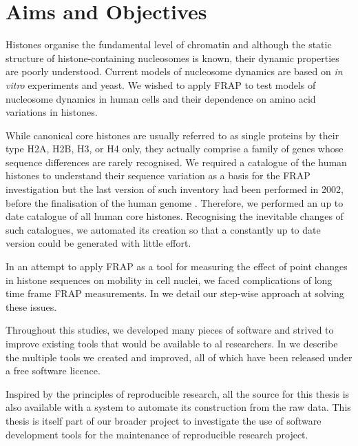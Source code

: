 

\section{Aims and Objectives}

  Histones organise the fundamental level of chromatin and
  although the static structure of histone-containing nucleosomes is
  known, their dynamic properties are poorly understood.  Current
  models of nucleosome dynamics are based on \textit{in vitro}
  experiments and yeast.  We wished to apply FRAP to test
  models of nucleosome dynamics in human cells and their dependence on
  amino acid variations in histones.

  While canonical core histones are usually referred to as single
  proteins by their type H2A, H2B,
  H3, or H4 only, they actually comprise a family of genes whose
  sequence differences are rarely recognised.
  We required a catalogue of the human histones to understand their
  sequence variation as a basis for the FRAP investigation
  but the last version of such inventory had been performed in
  2002, before the finalisation of the human genome \citep{Marzluff02}.
  Therefore, we performed an up to
  date catalogue of all human core histones.  Recognising the inevitable
  changes of such catalogues, we automated its creation so that a
  constantly up to date version could be generated with little effort.

  In an attempt to apply FRAP as a tool for measuring the effect of point
  changes in histone sequences on mobility in cell nuclei,
  we faced complications
  of long time frame FRAP measurements.  In  we detail our
  step-wise approach at solving these issues.

  Throughout this studies, we developed many pieces of software and
  strived to improve existing tools that would be available to al
  researchers.  In  we describe the multiple tools we
  created and improved, all of which have been released under a free
  software licence.

  Inspired by the principles of reproducible research, all the source
  for this thesis is also available with a system to automate its
  construction from the raw data.  This thesis is itself part of our
  broader project to investigate
  the use of software development tools for the maintenance of
  reproducible research project.
